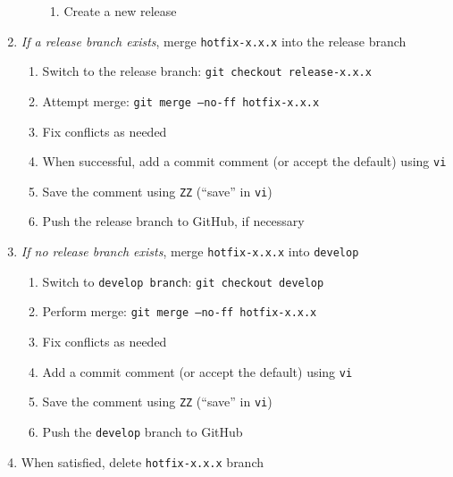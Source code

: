 \documentclass{article}
\begin{document}
\begin{enumerate}
\begin{enumerate}
\begin{enumerate}
	  \item Create a new release

	\end{enumerate}
  \end{enumerate}
  
  \item \emph{If a release branch exists}, 
  		merge \texttt{hotfix-x.x.x} into the release branch
  \begin{enumerate}

    \item Switch to the release branch: \texttt{git checkout release-x.x.x} 

    \item Attempt merge: \texttt{git merge --no-ff hotfix-x.x.x}
	
	\item Fix conflicts as needed
	
	\item When successful, add a commit comment (or accept the default) using \texttt{vi} 
	
	\item Save the comment using \texttt{ZZ} (``save'' in \texttt{vi})
	
	\item Push the release branch to GitHub, if necessary

  \end{enumerate}
  \item \emph{If no release branch exists}, merge \texttt{hotfix-x.x.x} into \texttt{develop} 
  \begin{enumerate}

    \item Switch to \texttt{develop branch}: \texttt{git checkout develop} 

    \item Perform merge: \texttt{git merge --no-ff hotfix-x.x.x} 
	
	\item Fix conflicts as needed
	
	\item Add a commit comment (or accept the default) using \texttt{vi} 
	
	\item Save the comment using \texttt{ZZ} (``save'' in \texttt{vi})
	
	\item Push the \texttt{develop} branch to GitHub 

  \end{enumerate}
  \item When satisfied, delete \texttt{hotfix-x.x.x} branch
  \begin{enumerate}


\end{enumerate}
\end{enumerate}
\end{document}
